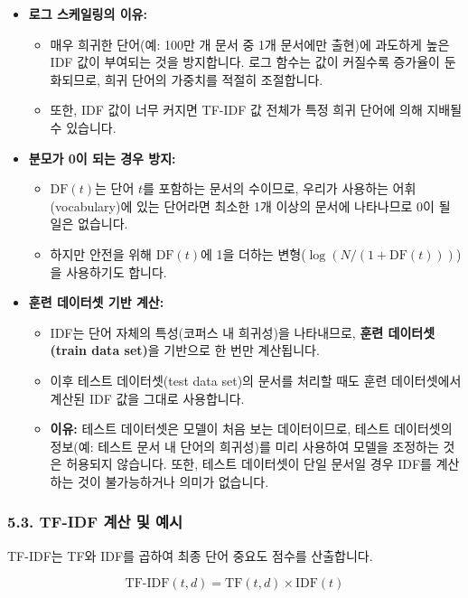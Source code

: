 \documentclass[11pt,a4paper]{article}
\begin{document}
\begin{itemize}
    \item \textbf{로그 스케일링의 이유:}
    \begin{itemize}
        \item 매우 희귀한 단어(예: 100만 개 문서 중 1개 문서에만 출현)에 과도하게 높은 IDF 값이 부여되는 것을 방지합니다. 로그 함수는 값이 커질수록 증가율이 둔화되므로, 희귀 단어의 가중치를 적절히 조절합니다.
        \item 또한, IDF 값이 너무 커지면 TF-IDF 값 전체가 특정 희귀 단어에 의해 지배될 수 있습니다.
    \end{itemize}
    \item \textbf{분모가 0이 되는 경우 방지:}
    \begin{itemize}
        \item $\text{DF}(t)$는 단어 $t$를 포함하는 문서의 수이므로, 우리가 사용하는 어휘(vocabulary)에 있는 단어라면 최소한 1개 이상의 문서에 나타나므로 0이 될 일은 없습니다.
        \item 하지만 안전을 위해 $\text{DF}(t)$에 1을 더하는 변형($\log(N / (1 + \text{DF}(t)))$)을 사용하기도 합니다.
    \end{itemize}
    \item \textbf{훈련 데이터셋 기반 계산:}
    \begin{itemize}
        \item IDF는 단어 자체의 특성(코퍼스 내 희귀성)을 나타내므로, \textbf{훈련 데이터셋(train data set)}을 기반으로 한 번만 계산됩니다.
        \item 이후 테스트 데이터셋(test data set)의 문서를 처리할 때도 훈련 데이터셋에서 계산된 IDF 값을 그대로 사용합니다.
        \item \textbf{이유:} 테스트 데이터셋은 모델이 처음 보는 데이터이므로, 테스트 데이터셋의 정보(예: 테스트 문서 내 단어의 희귀성)를 미리 사용하여 모델을 조정하는 것은 허용되지 않습니다. 또한, 테스트 데이터셋이 단일 문서일 경우 IDF를 계산하는 것이 불가능하거나 의미가 없습니다.
    \end{itemize}
\end{itemize}

\subsubsection*{5.3. TF-IDF 계산 및 예시}
TF-IDF는 TF와 IDF를 곱하여 최종 단어 중요도 점수를 산출합니다.

\begin{tcolorbox}[mybox, title=TF-IDF 계산]
$$ \text{TF-IDF}(t, d) = \text{TF}(t, d) \times \text{IDF}(t) $$
\end{tcolorbox}
\end{document}
